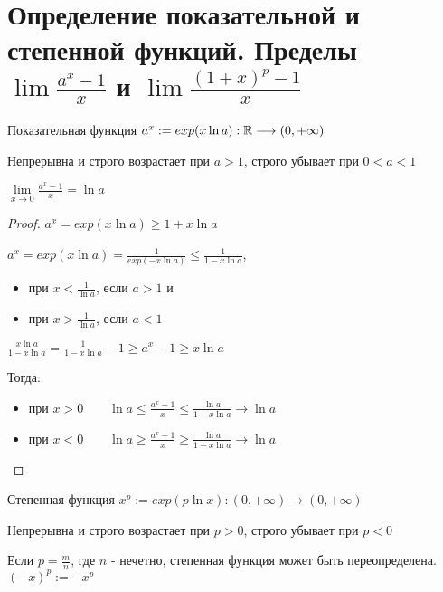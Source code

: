 \section{Определение показательной и степенной функций. Пределы $\lim{\frac{a^x - 1}{x}}$ и $\lim{\frac{(1+x)^p - 1}{x}}$}
\begin{conj}
    Показательная функция \qquad $a^x := exp(x \ln{a}): \mathbb{R} \longrightarrow (0, +\infty)$
    
    Непрерывна и строго возрастает при $a > 1$, строго убывает при $0 < a < 1$
\end{conj}

\begin{theorem-non}
    $\lim\limits_{x \rightarrow 0}{\frac{a^x - 1}{x}} = \ln{a}$

    \begin{proof}
        $a^x = exp(x \ln{a}) \geqslant 1 + x \ln{a}$

        $a^x = exp(x \ln{a}) = \frac{1}{exp(-x\ln{a})} \leqslant \frac{1}{1 - x \ln{a}}$,
        \begin{itemize}
            \item[] при $x < \frac{1}{\ln{a}}$, если $a > 1$ и 
            \item[] при $x > \frac{1}{\ln{a}}$, если $a < 1$ 
        \end{itemize}

        $\frac{x\ln{a}}{1 - x \ln{a}} = \frac{1}{1 - x \ln{a}} - 1 \geqslant a^x - 1 \geqslant x\ln{a}$

        Тогда:
        \begin{itemize}
            \item[] при $x > 0 \qquad \ln{a} \leqslant \frac{a^x - 1}{x} \leqslant \frac{\ln{a}}{1 - x \ln{a}} \longrightarrow \ln{a}$
            \item[] при $x < 0 \qquad \ln{a} \geqslant \frac{a^x - 1}{x} \geqslant \frac{\ln{a}}{1 - x \ln{a}} \longrightarrow \ln{a}$
        \end{itemize}
    \end{proof}
\end{theorem-non}

\begin{conj}
        Степенная функция $x^p := exp(p \ln{x}) : (0, +\infty) \longrightarrow (0, +\infty)$

        Непрерывна и строго возрастает при $p > 0$, строго убывает при $p < 0$

        Если $p = \frac{m}{n}$, где $n$ - нечетно, степенная функция может быть переопределена. $(-x)^p := -x^p$
\end{conj}

